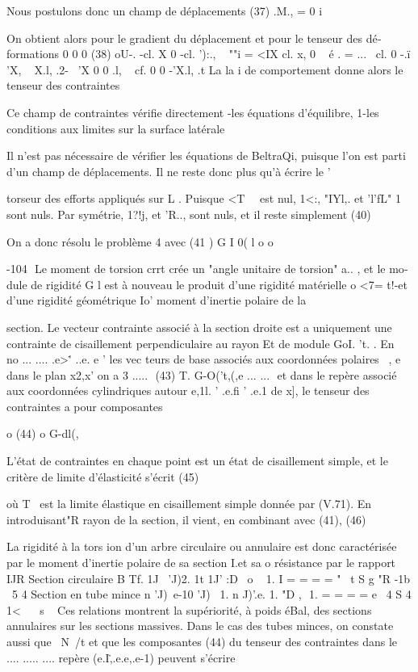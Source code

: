 {Nous postulons donc un champ de déplacements 
(37) .M., = 0
i 

On obtient alors pour le gradient du déplacement et pour le tenseur des dé­formations 
0 0 0 
(38) oU-. 
-cl. X 0 -cl. '):., 
~
""i = 
<IX cl. x, 0 
~ 
é . 
= 
...~ 
cl.
0 -.ï 'X, ~ X.l,
.2­-~ 'X 0 0 .l, ~ cf. 
0 0
-'X.l,
.t 
La la i de comportement donne alors le tenseur des contraintes 

Ce champ de contraintes vérifie directement -les équations d'équilibre, 
1-les conditions aux limites sur la surface latérale 

Il  n'est  pas  nécessaire  de  vérifier les  équations  de  BeltraQi,  puisque  l'on  
est  parti d'un champ  de  déplacements.  Il  ne  reste  donc  plus qu'à écrire  le  
' 

torseur des efforts appliqués sur L . Puisque <T~~ est nul, 1<:, "IYl,. et 'l'fL"
1 
sont nuls. Par symétrie, 1?!j, et 'R.., sont nuls, et il reste simplement 
(40) 


On a donc résolu le problème 4 avec 
(41 ) G I 0( l 
o 
o 


-104 ­
Le moment de torsion crrt crée un "angle unitaire de torsion" a.. , et le mo­
dule de rigidité G l est à nouveau le produit d'une rigidité matérielle 
o 
<7= t!-et d'une rigidité géométrique Io' moment d'inertie polaire de la 

section. 
Le vecteur contrainte associé à la section droite est 
a uniquement une contrainte de cisaillement perpendiculaire au 
rayon Et de module GoI. 't. . En no­
... ....
.e>\. ' ..e. e ' les vec teurs de base associés aux coordonnées polai­res ~, e dans le plan x2,x' on a
3 
..... ­
(43) T. G-O('t,(,e 
... ... ­
et dans le repère associé aux coordonnées cylindriques autour
e,1l. ' .e.fi ' .e.1 de x], le tenseur des contraintes a pour composantes 

o 
(44) 
o 
G-dl(, 

L'état de contraintes en chaque point est un état de cisaillement simple, et le critère de limite d'élasticité s'écrit 
(45) 


où T~ est la limite élastique en cisaillement simple donnée par (V.71). En introduisant"R rayon de la section, il vient, en combinant avec (41), 
(46) 


La rigidité à la tors ion d'un arbre circulaire ou annulaire est donc caractérisée par le moment d'inertie polaire de sa section I.et sa 
o 
résistance par le rapport 
IJR 
Section circulaire 
B 
Tf. 1J~ 'J)2. 1t 1J' :D
~o ~ 1.
I = = =
= 
" ~t S g "R -1b ~5 4­
Section en tube mince 
n 'J)~e-10 'J)~ 1. n J)'.e. 1. "D
, ­
1. = = = = 
e~ 
4 S 4 1< ~ ~s ~ 
Ces relations montrent la supériorité, à poids éBal, des sections annulaires sur les sections massives. Dans le cas des tubes minces, on constate aussi 
que ~N~/t et que les composantes (44) du tenseur des contraintes dans le 
.... ..... ....
repère (e.I\.,.e.e,.e-1) peuvent s'écrire 

}
